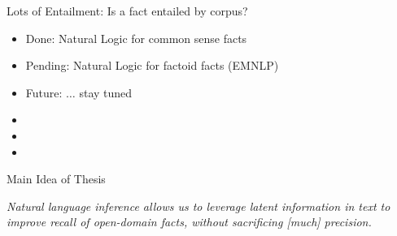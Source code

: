 \begin{frame}{Lots of Entailment: Is a fact entailed by corpus?}
\vspace{2em}

\pause
\begin{itemize}
  \item Done: Natural Logic for common sense facts
  \item Pending: Natural Logic for factoid facts (EMNLP)
  \item Future: $\dots$ stay tuned
\end{itemize}
\vspace{2em}
\pause

\begin{itemize}
  \item {}
  \item {}
  \item {}
\end{itemize}
\end{frame}

\begin{frame}{Main Idea of Thesis}
\begin{center}
\textit{
  Natural language inference allows us to leverage latent
  information in text to improve recall of open-domain facts, without
  sacrificing [much] precision.
}
\end{center}
\end{frame}
